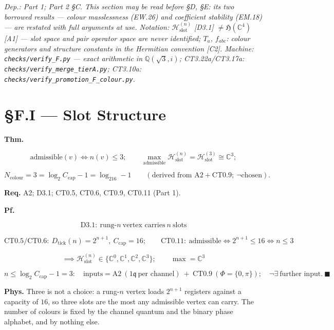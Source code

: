 \textit{Dep.: Part 1; Part 2 §C. This section may be read before §D, §E: its two borrowed results — colour masslessness (EW.26) and coefficient stability (EM.18) — are restated with full arguments at use. Notation: $\mathcal H^{(n)}_{\mathrm{slot}}$ [D3.1] $\ne\mathfrak H(\mathbb C^4)$ [A1] — slot space and pair operator space are never identified; $T_a$, $f_{abc}$: colour generators and structure constants in the Hermitian convention [C2]. Machine: \texttt{checks/\allowbreak{}verify\_\allowbreak{}F.py} — exact arithmetic in $\mathbb Q(\sqrt3,i)$; CT3.22a/CT3.17a: \texttt{checks/\allowbreak{}verify\_\allowbreak{}merge\_\allowbreak{}tierA.py}; CT3.10a: \texttt{checks/\allowbreak{}verify\_\allowbreak{}promotion\_\allowbreak{}F\_\allowbreak{}colour.py}.}

\section[§F.I — Slot Structure]{\texorpdfstring{§F.I — Slot Structure}{SF.I - Slot Structure}}

\begin{theorem}\label{tag:CT3-20}
\textbf{Thm.}

\[
\text{admissible}(v)\iff n(v)\le3;\qquad
\max_{\text{admissible}}\mathcal H^{(n)}_{\mathrm{slot}}=\mathcal H^{(3)}_{\mathrm{slot}}\cong\mathbb C^3;
\]

\[
N_{\text{colour}}=3=\log_2C_{\mathrm{cap}}-1=\log_216-1\qquad(\text{derived from A2}+\mathrm{CT0.9};\ \neg\text{chosen}).
\]

\textbf{Req.} A2; D3.1; CT0.5, CT0.6, CT0.9, CT0.11 (Part 1).

\textbf{Pf.}

\[
\mathrm{D3.1}:\ \text{rung-}n\ \text{vertex carries}\ n\ \text{slots}
\]

\[
\mathrm{CT0.5}/\mathrm{CT0.6}:\ D_{\mathrm{tick}}(n)=2^{n+1},\ C_{\mathrm{cap}}=16;\qquad
\mathrm{CT0.11}:\ \text{admissible}\iff2^{n+1}\le16\iff n\le3
\]

\[
\implies\mathcal H^{(n)}_{\mathrm{slot}}\in\{\mathbb C^0,\mathbb C^1,\mathbb C^2,\mathbb C^3\};\qquad\max=\mathbb C^3
\]

\[
n\le\log_2C_{\mathrm{cap}}-1=3:\quad\text{inputs}=\mathrm{A2}\ (1\mathfrak q\ \text{per channel})\ +\ \mathrm{CT0.9}\ (\Phi=\{0,\pi\});\quad\neg\exists\ \text{further input}.\ \blacksquare
\]

\textbf{Phys.} Three is not a choice: a rung-$n$ vertex loads $2^{n+1}$ registers against a capacity of $16$, so three slots are the most any admissible vertex can carry. The number of colours is fixed by the channel quantum and the binary phase alphabet, and by nothing else.

\end{theorem}

